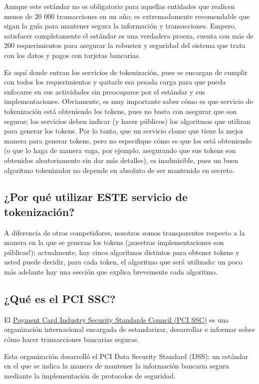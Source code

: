 Aunque este estándar no es obligatorio para aquellas entidades que
realicen menos de 20 000 transacciones en un año; es extremadamente
recomendable que sigan la guía para mantener segura la información y
transacciones.  Empero, satisfacer completamente el estándar es una
verdadera proeza, cuenta con más de 200 requerimientos para asegurar la
robustez y seguridad del sistema que trata con los datos y pagos con
tarjetas bancarias.

Es aquí donde entran los servicios de tokenización, pues se encargan de
cumplir con todos los requerimientos y quitarle esa pesada carga para
que pueda enfocarse en sus actividades sin preocuparse por el estándar y
sus implementaciones. Obviamente, es muy importante saber cómo es que
servicio de tokenización está obteniendo los tokens, pues no basta con
asegurar que son seguros; los servicios deben indicar (y hacer públicos)
los algoritmos que utilizan para generar los tokens. Por lo tanto, que
un servicio clame que tiene la mejor manera para generar tokens, pero no
especifique cómo es que los está obteniendo (o que lo haga de manera
vaga, por ejemplo, asegurando que sus tokens son obtenidos
aleatoriamente sin dar más detalles), es inadmisible, pues un buen
algoritmo tokenizador no depende en absoluto de ser mantenido en
secreto.

\subsection{¿Por qué utilizar ESTE servicio de tokenización?}

A diferencia de otros competidores, nosotros somos transparentes
respecto a la manera en la que se generan los tokens (¡nuestras
implementaciones son públicas!); actualmente, hay cinco algoritmos
distintos para obtener tokens y usted puede decidir, para cada token, el
algoritmo que será utilizado: un poco más adelante hay una sección que
explica brevemente cada algoritmo.

\subsection{¿Qué es el PCI SSC?}

El \href{https://www.pcisecuritystandards.org/pci_security/}{Payment Card
Industry Security Standards Council (PCI SSC)} es una organización
internacional encargada de estandarizar, desarrollar e informar sobre cómo
hacer transacciones bancarias seguras.

Esta organización desarrolló el PCI Data Security Standard (DSS): un
estándar en el que se indica la manera de mantener la información
bancaria segura mediante la implementación de protocolos de seguridad.

